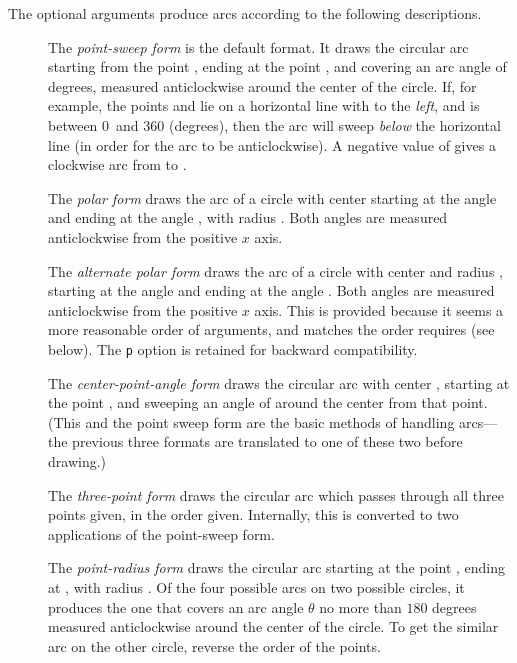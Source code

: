 \documentclass[letterpaper]{article}
\begin{document}
The optional arguments produce arcs according to the following
descriptions.
\begin{description}
\item[] The \textit{point-sweep form} is the default format. It
draws the circular arc starting from the point , ending at
the point , and covering an arc angle of \meta{$\theta$}
degrees, measured anticlockwise around the center of the circle. If,
for example, the points  and  lie on a
horizontal line with  to the \emph{left}, and \meta{$\theta$}
is between 0~and 360 (degrees), then the arc will sweep \emph{below} the
horizontal line (in order for the arc to be anticlockwise). A
negative value of \meta{$\theta$} gives a clockwise arc from 
to .

\item[] The \textit{polar form} draws the arc of a circle with
center  starting at the angle  and ending at
the angle , with radius . Both angles are
measured anticlockwise from the positive $x$ axis.

\item[] The \textit{alternate polar form} draws the arc of a
circle with center  and radius , starting at the
angle  and ending at the angle . Both
angles are measured anticlockwise from the positive $x$ axis. This is
provided because it seems a more reasonable order of arguments, and
matches the order  requires (see below). The \texttt{p}
option is retained for backward compatibility.

\item[] The \textit{center-point-angle form} draws the circular
arc with center , starting at the point , and
sweeping an angle of \meta{$\theta$} around the center from that point.
(This and the point sweep form are the basic methods of handling
arcs---the previous three formats are translated to one of these two
before drawing.)

\item[] The \textit{three-point form} draws the circular arc
which passes through all three points given, in the order given.
Internally, this is converted to two applications of the point-sweep
form.

\item[] The \textit{point-radius form} draws the circular arc
starting at the point , ending at ,
with radius . Of the four possible arcs on two possible
circles, it produces the one that covers an arc angle $\theta$
no more than $180$ degrees measured anticlockwise around the center
of the circle. To get the similar arc on the other circle, reverse the
order of the points.


\end{description}
\end{document}
